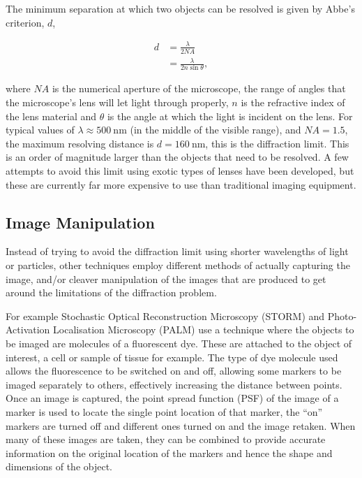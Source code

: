 The minimum separation at which two objects can be resolved is given by Abbe's
criterion, $d$,

\begin{align}
	d &= \frac{\lambda}{2N\!A} \\
	  &= \frac{\lambda}{2n\sin\theta},
\end{align}

where $N\!A$ is the numerical aperture of the microscope, the range of angles
that the microscope's lens will let light through properly, $n$ is the
refractive index of the lens material and $\theta$ is the angle at which the
light is incident on the lens. For typical values of $\lambda \approx
\SI{500}{\nano\metre}$ (in the middle of the visible range), and $N\!A = 1.5$,
the maximum resolving distance is $d = \SI{160}{\nano\meter}$, this is the
diffraction limit. This is an order of magnitude larger than the objects that
need to be resolved. A few attempts to avoid this limit using exotic types of
lenses have been developed\cite{fang2005sub}, but these are currently far more
expensive to use than traditional imaging equipment.

\subsection{Image Manipulation}
\label{sub:image_manipulation}

Instead of trying to avoid the diffraction limit using shorter wavelengths of
light or particles, other techniques employ different methods of actually
capturing the image, and/or cleaver manipulation of the images that are
produced to get around the limitations of the diffraction problem.

For example Stochastic Optical Reconstruction Microscopy (STORM)
\cite{rust2006sub} and Photo-Activation Localisation Microscopy
(PALM)\cite{owen2010palm} use a technique where the objects to be imaged are
molecules of a fluorescent dye. These are attached to the object of interest, a
cell or sample of tissue for example. The type of dye molecule used allows the
fluorescence to be switched on and off, allowing some markers to be imaged
separately to others, effectively increasing the distance between points. Once
an image is captured, the point spread function (PSF) of the image of a marker
is used to locate the single point location of that marker, the ``on'' markers
are turned off and different ones turned on and the image retaken.  When many
of these images are taken, they can be combined to provide accurate information
on the original location of the markers and hence the shape and dimensions of
the object.

